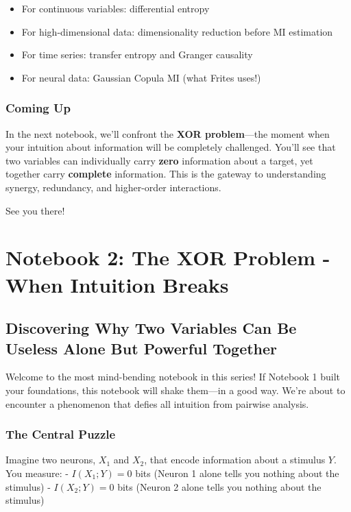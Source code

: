 \documentclass[
  11pt,
  letterpaper,
  oneside,
  openany]{book}
\providecommand{\tightlist}{%
  \setlength{\itemsep}{0pt}\setlength{\parskip}{0pt}}
\begin{document}
\begin{itemize}
\tightlist
\item
  For continuous variables: differential entropy
\item
  For high-dimensional data: dimensionality reduction before MI
  estimation\\
\item
  For time series: transfer entropy and Granger causality
\item
  For neural data: Gaussian Copula MI (what Frites uses!)
\end{itemize}

\subsection{Coming Up}\label{coming-up}

In the next notebook, we'll confront the \textbf{XOR problem}---the
moment when your intuition about information will be completely
challenged. You'll see that two variables can individually carry
\textbf{zero} information about a target, yet together carry
\textbf{complete} information. This is the gateway to understanding
synergy, redundancy, and higher-order interactions.

See you there! 🚀

\chapter{Notebook 2: The XOR Problem - When Intuition
Breaks}\label{notebook-2-the-xor-problem---when-intuition-breaks}

\section{Discovering Why Two Variables Can Be Useless Alone But Powerful
Together}\label{discovering-why-two-variables-can-be-useless-alone-but-powerful-together}

Welcome to the most mind-bending notebook in this series! If Notebook 1
built your foundations, this notebook will shake them---in a good way.
We're about to encounter a phenomenon that defies all intuition from
pairwise analysis.

\subsection{The Central Puzzle}\label{the-central-puzzle}

Imagine two neurons, \(X_1\) and \(X_2\), that encode information about
a stimulus \(Y\). You measure: - \(I(X_1; Y) = 0\) bits (Neuron 1 alone
tells you nothing about the stimulus) - \(I(X_2; Y) = 0\) bits (Neuron 2
alone tells you nothing about the stimulus)
\end{document}
